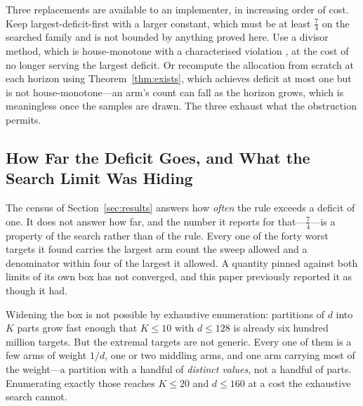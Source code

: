 Three replacements are available to an implementer, in increasing order of cost. Keep
largest-deficit-first with a larger constant, which must be at least $\tfrac74$ on the searched
family and is not bounded by anything proved here. Use a divisor method, which is
house-monotone with a characterised violation \cite{balinski1982}, at the cost of no longer
serving the largest deficit. Or recompute the allocation from scratch at each horizon using
Theorem~\ref{thm:exists}, which achieves deficit at most one but is not house-monotone---an
arm's count can fall as the horizon grows, which is meaningless once the samples are drawn.
The three exhaust what the obstruction permits.

\subsection{How Far the Deficit Goes, and What the Search Limit Was Hiding}
\label{sec:frontier}

The census of Section~\ref{sec:results} answers how \emph{often} the rule exceeds a deficit of
one. It does not answer how far, and the number it reports for that---$\tfrac74$---is a
property of the search rather than of the rule. Every one of the forty worst targets it found
carries the largest arm count the sweep allowed and a denominator within four of the largest
it allowed. A quantity pinned against both limits of its own box has not converged, and this
paper previously reported it as though it had.

Widening the box is not possible by exhaustive enumeration: partitions of $d$ into $K$ parts
grow fast enough that $K\le10$ with $d\le128$ is already six hundred million targets. But the
extremal targets are not generic. Every one of them is a few arms of weight $1/d$, one or two
middling arms, and one arm carrying most of the weight---a partition with a handful of
\emph{distinct values}, not a handful of parts. Enumerating exactly those reaches
$K\le20$ and $d\le160$ at a cost the exhaustive search cannot.

